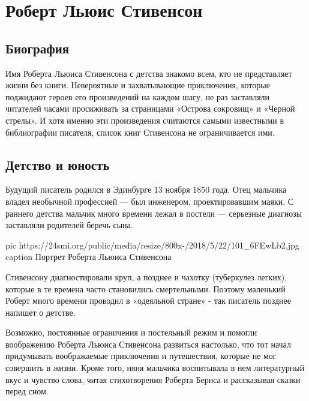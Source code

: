  
 
 

\section{Роберт Льюис Стивенсон}

\subsection{Биография}

Имя Роберта Льюиса Стивенсона с детства знакомо всем, кто не представляет
жизни без книги. Невероятные и захватывающие приключения, которые
поджидают героев его произведений на каждом шагу, не раз заставляли
читателей часами просиживать за страницами «Острова сокровищ» и «Черной
стрелы». И хотя именно эти произведения считаются самыми известными в
библиографии писателя, список книг Стивенсона не ограничивается ими.

\subsection{Детство и юность}

Будущий писатель родился в Эдинбурге 13 ноября 1850 года. Отец мальчика
владел необычной профессией — был инженером, проектировавшим маяки. С
раннего детства мальчик много времени лежал в постели — серьезные диагнозы
заставляли родителей беречь сына.

\ifcmt
pic https://24smi.org/public/media/resize/800x-/2018/5/22/101_6FEwLb2.jpg
caption Портрет Роберта Льюиса Стивенсона
\fi

Стивенсону диагностировали круп, а позднее и чахотку (туберкулез легких),
которые в те времена часто становились смертельными. Поэтому маленький Роберт
много времени проводил в «одеяльной стране» - так писатель позднее напишет о
детстве.

Возможно, постоянные ограничения и постельный режим и помогли воображению
Роберта Льюиса Стивенсона развиться настолько, что тот начал придумывать
воображаемые приключения и путешествия, которые не мог совершить в жизни.
Кроме того, няня мальчика воспитывала в нем литературный вкус и чувство слова,
читая стихотворения Роберта Бернса и рассказывая сказки перед сном.

